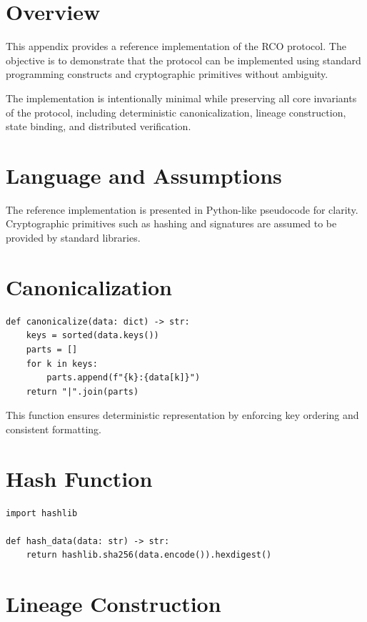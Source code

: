 \section{Overview}

This appendix provides a reference implementation of the RCO protocol. The objective is to demonstrate that the protocol can be implemented using standard programming constructs and cryptographic primitives without ambiguity.

The implementation is intentionally minimal while preserving all core invariants of the protocol, including deterministic canonicalization, lineage construction, state binding, and distributed verification.

\section{Language and Assumptions}

The reference implementation is presented in Python-like pseudocode for clarity. Cryptographic primitives such as hashing and signatures are assumed to be provided by standard libraries.

\section{Canonicalization}

\begin{verbatim}
def canonicalize(data: dict) -> str:
    keys = sorted(data.keys())
    parts = []
    for k in keys:
        parts.append(f"{k}:{data[k]}")
    return "|".join(parts)
\end{verbatim}

This function ensures deterministic representation by enforcing key ordering and consistent formatting.

\section{Hash Function}

\begin{verbatim}
import hashlib

def hash_data(data: str) -> str:
    return hashlib.sha256(data.encode()).hexdigest()
\end{verbatim}

\section{Lineage Construction}

